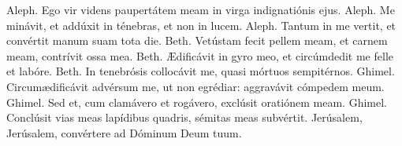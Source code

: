 
\lesson


Aleph. Ego vir videns paupertátem meam in virga indignatiónis ejus.
Aleph. Me minávit, et addúxit in ténebras, et non in lucem. Aleph.
Tantum in me vertit, et convértit manum suam tota die. Beth. Vetústam
fecit pellem meam, et carnem meam, contrívit ossa mea. Beth. Ædificávit
in gyro meo, et circúmdedit me felle et labóre. Beth. In tenebrósis
collocávit me, quasi mórtuos sempitérnos. Ghimel. Circumædificávit
advérsum me, ut non egrédiar: aggravávit cómpedem meum. Ghimel. Sed et,
cum clamávero et rogávero, exclúsit oratiónem meam. Ghimel. Conclúsit
vias meas lapídibus quadris, sémitas meas subvértit. Jerúsalem,
Jerúsalem, convértere ad Dóminum Deum tuum.

